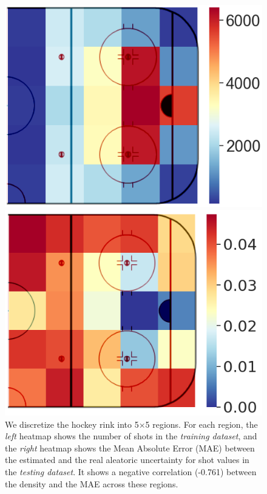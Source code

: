 \documentclass[letterpaper]{article} %
\begin{document}
\begin{figure}[htbp]
    \centering
    \begin{minipage}[t]{0.45\linewidth}
    \includegraphics[scale=0.18]{figures/spatial_train_num_blend_crop.png}
    \end{minipage}
    \begin{minipage}[t]{0.45\linewidth}
    \includegraphics[scale=0.18]{figures/spatial_std_diff_blend_crop.png}
    \end{minipage}
    \captionsetup{width=.95\linewidth}
    \caption{We discretize the hockey rink into 5$\times$5 regions. For each region, the {\it left} heatmap shows the number of shots in the {\it training dataset}, and the {\it right} heatmap shows the Mean Absolute Error (MAE) between the estimated and the real aleatoric uncertainty for shot values in the {\it testing dataset}. It shows a negative correlation (-0.761) between the density and the MAE across these regions.}
    \label{fig:spatial-uncertainty}
\end{figure}
\end{document}
